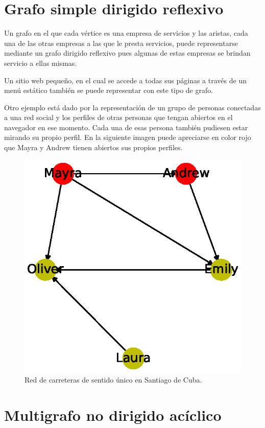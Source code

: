 \documentclass{article}
\begin{document}
\section{Grafo simple dirigido reflexivo}

Un grafo en el que cada vértice es una empresa de servicios y las aristas, cada una de las otras empresas a las que le presta servicios, puede representarse mediante un grafo dirigido reflexivo pues algunas de estas empresas se brindan servicio a ellas mismas. 

Un sitio web pequeño, en el cual se accede a todas sus páginas a través de un menú estático también se puede representar con este tipo de grafo. 

Otro ejemplo está dado por la representación de un grupo de personas conectadas a una red social y los perfiles de otras personas que tengan abiertos en el navegador en ese momento. Cada una de esas persona también pudiesen estar mirando su propio
perfil. En la siguiente imagen puede apreciarse en color rojo que Mayra y Andrew tienen abiertos sus propios perfiles.


\begin{figure}
  \includegraphics[width=.8\columnwidth]{6.eps}
  \caption{Red de carreteras de sentido único en Santiago de Cuba.}
  \label{fig:6}
\end{figure}

\section{Multigrafo no dirigido acíclico}
\end{document}
